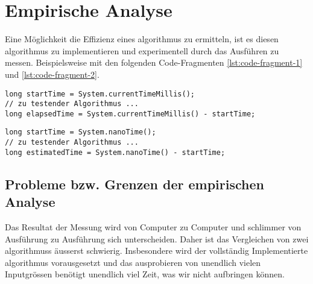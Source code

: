 \section{Empirische Analyse}

Eine Möglichkeit die Effizienz eines \gls{algorithmus} zu ermitteln, ist es diesen \gls{algorithmus} zu implementieren und experimentell durch das Ausführen zu messen. Beispielsweise mit den folgenden Code-Fragmenten \ref{lst:code-fragment-1} und \ref{lst:code-fragment-2}.

\par \medskip

\renewcommand{\lstlistingname}{Code Fragment}%

\begin{lstlisting}[captionpos=b,caption={Typische Lösung für die Zeitmessung eines Algorithmus in Java},label={lst:code-fragment-1}]
long startTime = System.currentTimeMillis();
// zu testender Algorithmus ...
long elapsedTime = System.currentTimeMillis() - startTime;   
\end{lstlisting}

\par \medskip

\begin{lstlisting}[captionpos=b,caption={Zeitmessung eines Algorithmus in Java mit nanoTime()},label={lst:code-fragment-2}]
long startTime = System.nanoTime();
// zu testender Algorithmus ...
long estimatedTime = System.nanoTime() - startTime;
\end{lstlisting}

\subsection*{Probleme bzw. Grenzen der empirischen Analyse}
Das Resultat der Messung wird von Computer zu Computer und schlimmer von Ausführung zu Ausführung sich unterscheiden. Daher ist das Vergleichen von zwei \glspl{algorithmus} äusserst schwierig. Insbesondere wird der vollständig Implementierte \gls{algorithmus} vorausgesetzt und das ausprobieren von unendlich vielen Inputgrössen benötigt unendlich viel Zeit, was wir nicht aufbringen können.